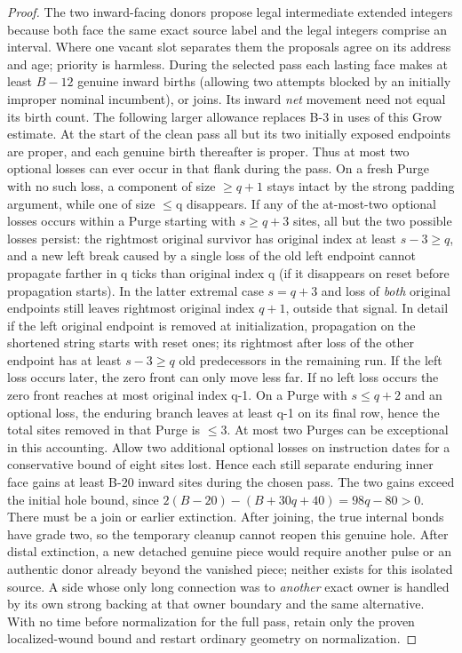 \begin{proof}
The two inward-facing donors propose legal intermediate extended integers because both face the same exact source label and the legal integers comprise an interval. Where one vacant slot separates them the proposals agree on its address and age; priority is harmless. During the selected pass each lasting face makes at least \(B- 12\) genuine inward births (allowing two attempts blocked by an initially improper nominal incumbent), or joins. Its inward \emph{net} movement need not equal its birth count. The following larger allowance replaces B-3 in uses of this Grow estimate. At the start of the clean pass all but its two initially exposed endpoints are proper, and each genuine birth thereafter is proper. Thus at most two optional losses can ever occur in that flank during the pass. On a fresh Purge with no such loss, a component of size \(\ge\)\(q+1\) stays intact by the strong padding argument, while one of size \(\le\)q disappears. If any of the at-most-two optional losses occurs within a Purge starting with \(s\ge q+3\) sites, all but the two possible losses persist: the rightmost original survivor has original index at least \(s-3\ge q\), and a new left break caused by a single loss of the old left endpoint cannot propagate farther in q ticks than original index q (if it disappears on reset before propagation starts). In the latter extremal case \(s=q+3\) and loss of \emph{both} original endpoints still leaves rightmost original index \(q+1\), outside that signal. In detail if the left original endpoint is removed at initialization, propagation on the shortened string starts with reset ones; its rightmost after loss of the other endpoint has at least \(s-3\ge q\) old predecessors in the remaining run. If the left loss occurs later, the zero front can only move less far. If no left loss occurs the zero front reaches at most original index q-1. On a Purge with \(s\le q+2\) and an optional loss, the enduring branch leaves at least q-1 on its final row, hence the total sites removed in that Purge is \(\le\)3. At most two Purges can be exceptional in this accounting. Allow two additional optional losses on instruction dates for a conservative bound of eight sites lost. Hence each still separate enduring inner face gains at least B-20 inward sites during the chosen pass. The two gains exceed the initial hole bound, since \(2(B-20)-(B+30q+40)=98q-80>0\). There must be a join or earlier extinction. After joining, the true internal bonds have grade two, so the temporary cleanup cannot reopen this genuine hole. After distal extinction, a new detached genuine piece would require another pulse or an authentic donor already beyond the vanished piece; neither exists for this isolated source. A side whose only long connection was to \emph{another} exact owner is handled by its own strong backing at that owner boundary and the same alternative. With no time before normalization for the full pass, retain only the proven localized-wound bound and restart ordinary geometry on normalization.


\end{proof}
